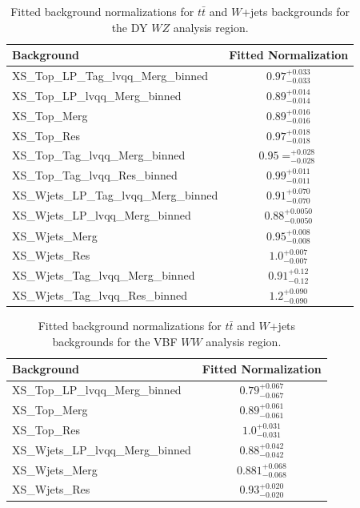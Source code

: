 \begin{table}
\begin{tabular}{|l|c|}
\hline
Background & Fitted Normalization \\\hline
XS\_Top\_LP\_Tag\_lvqq\_Merg\_binned & $0.97^{+0.033}_{-0.033}$ \\\hline
XS\_Top\_LP\_lvqq\_Merg\_binned & $0.89^{+0.014}_{-0.014}$ \\\hline
XS\_Top\_Merg & $0.89^{+0.016}_{-0.016}$ \\\hline
XS\_Top\_Res & $0.97^{+0.018}_{-0.018}$ \\\hline
XS\_Top\_Tag\_lvqq\_Merg\_binned & $0.95=^{+0.028}_{-0.028}$ \\\hline
XS\_Top\_Tag\_lvqq\_Res\_binned & $0.99^{+0.011}_{-0.011}$ \\\hline
XS\_Wjets\_LP\_Tag\_lvqq\_Merg\_binned & $0.91^{+0.070}_{-0.070}$ \\\hline
XS\_Wjets\_LP\_lvqq\_Merg\_binned & $0.88^{+0.0050}_{-0.0050}$ \\\hline
XS\_Wjets\_Merg & $0.95^{+0.008}_{-0.008}$ \\\hline
XS\_Wjets\_Res & $1.0^{+0.007}_{-0.007}$ \\\hline
XS\_Wjets\_Tag\_lvqq\_Merg\_binned & $0.91^{+0.12}_{-0.12}$ \\\hline
XS\_Wjets\_Tag\_lvqq\_Res\_binned & $1.2^{+0.090}_{-0.090}$ \\\hline
\end{tabular}
\caption{Fitted background normalizations for $t\bar{t}$ and $W$+jets backgrounds for the DY $WZ$ analysis region.}
\label{tbl:hvtwz_norm}
\end{table}


\begin{table}
\begin{tabular}{|l|c|}
\hline
Background & Fitted Normalization \\\hline
XS\_Top\_LP\_lvqq\_Merg\_binned & $0.79^{+0.067}_{-0.067}$ \\\hline
XS\_Top\_Merg & $0.89^{+0.061}_{-0.061}$ \\\hline
XS\_Top\_Res & $1.0^{+0.031}_{-0.031}$ \\\hline
XS\_Wjets\_LP\_lvqq\_Merg\_binned & $0.88^{+0.042}_{-0.042}$ \\\hline
XS\_Wjets\_Merg & $0.881^{+0.068}_{-0.068}$ \\\hline
XS\_Wjets\_Res & $0.93^{+0.020}_{-0.020}$ \\\hline
\end{tabular}
\caption{Fitted background normalizations for $t\bar{t}$ and $W$+jets backgrounds for the VBF $WW$ analysis region.}
\label{tbl:hvtwwvbf_norm}
\end{table}

